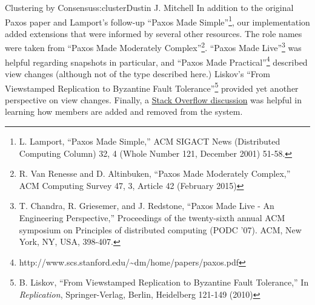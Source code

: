 \begin{aosachapter}{Clustering by Consensus}{s:cluster}{Dustin J. Mitchell}
In addition to the original Paxos paper and Lamport's follow-up ``Paxos
Made Simple''\footnote{L. Lamport, ``Paxos Made Simple,'' ACM SIGACT
  News (Distributed Computing Column) 32, 4 (Whole Number 121, December
  2001) 51-58.}, our implementation added extensions that were informed
by several other resources. The role names were taken from ``Paxos Made
Moderately Complex''\footnote{R. Van Renesse and D. Altinbuken, ``Paxos
  Made Moderately Complex,'' ACM Computing Survey 47, 3, Article 42
  (February 2015)}. ``Paxos Made Live''\footnote{T. Chandra, R.
  Griesemer, and J. Redstone, ``Paxos Made Live - An Engineering
  Perspective,'' Proceedings of the twenty-sixth annual ACM symposium on
  Principles of distributed computing (PODC '07). ACM, New York, NY,
  USA, 398-407.} was helpful regarding snapshots in particular, and
``Paxos Made Practical''\footnote{http://www.scs.stanford.edu/\textasciitilde{}dm/home/papers/paxos.pdf}
described view changes (although not of the type described here.)
Liskov's ``From Viewstamped Replication to Byzantine Fault
Tolerance''\footnote{B. Liskov, ``From Viewstamped Replication to
  Byzantine Fault Tolerance,'' In \emph{Replication}, Springer-Verlag,
  Berlin, Heidelberg 121-149 (2010)} provided yet another perspective on
view changes. Finally, a
\href{http://stackoverflow.com/questions/21353312/in-part-time-parliament-why-does-using-the-membership-from-decree-n-3-work-to}{Stack
Overflow discussion} was helpful in learning how members are added and
removed from the system.

\end{aosachapter}
